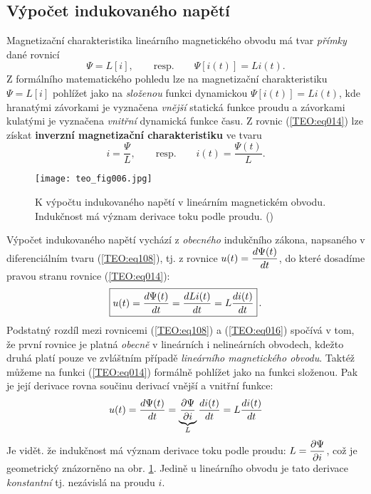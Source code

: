    \subsection{Výpočet indukovaného napětí}
      Magnetizační charakteristika lineárního magnetického obvodu má tvar \emph{přímky} dané rovnicí
      \begin{equation}\label{TEO:eq014}
        \Psi = L[i], \qquad\text{resp.}\qquad \Psi[i(t)] = Li(t).
      \end{equation}
      Z formálního matematického pohledu lze na magnetizační charakteristiku \(\Psi = L[i]\) 
      pohlížet jako na \emph{složenou} funkci dynamickou \(\Psi[i(t)] = Li(t)\), kde hranatými 
      závorkami je vyznačena \emph{vnější} statická funkce proudu a závorkami kulatými je vyznačena 
      \emph{vnitřní} dynamická funkce času. Z rovnic (\ref{TEO:eq014}) lze získat \textbf{inverzní 
      magnetizační charakteristiku} ve tvaru
      \begin{equation}\label{TEO:eq015}
        i = \frac{\Psi}{L}, \qquad\text{resp.}\qquad i(t) = \frac{\Psi(t)}{L}.
      \end{equation}
      
      \begin{figure}[ht!]  %
        \centering
        \texttt{[image: teo\_fig006.jpg]}
        \caption{K výpočtu indukovaného napětí v lineárním magnetickém obvodu. Indukčnost má význam 
                 derivace toku podle proudu.
                (\cite[s.~154]{Patocka4})}
        \label{teo:fig006}
      \end{figure}
      Výpočet indukovaného napětí vychází z \emph{obecného} indukčního zákona, napsaného v 
      diferenciálním tvaru (\ref{TEO:eq108}), tj. z rovnice \(u(t) = \dfrac{d \Psi(t)}{d t}\), do 
      které dosadíme pravou stranu rovnice (\ref{TEO:eq014}):
      \begin{equation}\label{TEO:eq016}
        \boxed{u(t) = \dfrac{d \Psi(t)}{d t} = \dfrac{d Li(t)}{d t} = L\dfrac{d i(t)}{d t}}\,.
      \end{equation}
      Podstatný rozdíl mezi rovnicemi (\ref{TEO:eq108}) a (\ref{TEO:eq016}) spočívá v tom, 
      že první rovnice je platná \emph{obecně} v lineárních i nelineárních obvodech, kdežto druhá 
      platí pouze ve zvláštním případě \emph{lineárního magnetického obvodu}. Taktéž můžeme na 
      funkci (\ref{TEO:eq014}) formálně pohlížet jako na funkci složenou. Pak je její derivace 
      rovna součinu derivací vnější a vnitřní funkce:
      \begin{equation}\label{TEO:eq017}
        u(t) = \dfrac{d \Psi(t)}{d t} = \underbrace{\dfrac{\partial \Psi}{\partial i}}_L\dfrac{d i(t)}{d t} = L\dfrac{d i(t)}{d t}
      \end{equation}
      Je vidět. že indukčnost má význam derivace toku podle proudu: \(L = \dfrac{\partial \Psi}{\partial i}\), což je 
      geometrický znázorněno na obr. \ref{teo:fig006}. Jedině u lineárního obvodu je tato derivace 
      \emph{konstantní} tj. nezávislá na proudu \(i\).
      

